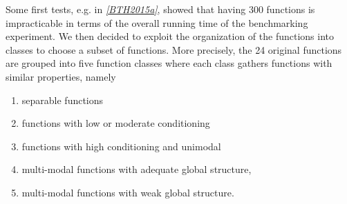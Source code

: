 \documentclass[letterpaper,12pt,english]{article}
\begin{document}
Some first tests, e.g. in \label{index:id5}{\hyperref[index:bth2015a]{\emph{{[}BTH2015a{]}}}}, showed that having 300 functions is
impracticable in terms of the overall running time of the benchmarking
experiment.  We then decided to exploit the organization of the 
functions into classes to choose a subset of functions. More precisely, the 24
original  functions are grouped into five function classes where each
class gathers functions with similar properties, namely
\begin{enumerate}
\item {} 
separable functions

\item {} 
functions with low or moderate conditioning

\item {} 
functions with high conditioning and unimodal

\item {} 
multi-modal functions with adequate global structure,

\item {} 
multi-modal functions with weak global structure.

\end{enumerate}
\end{document}
